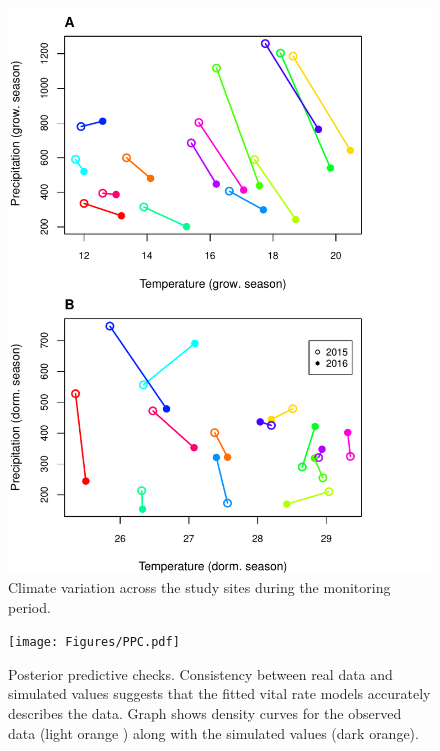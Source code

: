\documentclass[12pt]{article}\usepackage[]{graphicx}\usepackage[dvipsnames]{xcolor}
\begin{document}
\begin{figure}[H]
		\centering
		\includegraphics[width=0.959\linewidth]{Figures/site_year_weather.pdf}
		\caption{Climate variation across the study sites during the monitoring period.}
		\label{Sup:climate_variation}
\end{figure}

	
\begin{figure}[H]
		\centering
		\texttt{[image: Figures/PPC.pdf]}
		\caption{Posterior predictive checks. Consistency between real data and simulated values suggests that the fitted vital rate models accurately describes the data. Graph shows density curves for the observed data (light orange ) along with the simulated values (dark orange).}
		\label{Sup:PPC}
	\end{figure}
\end{document}
